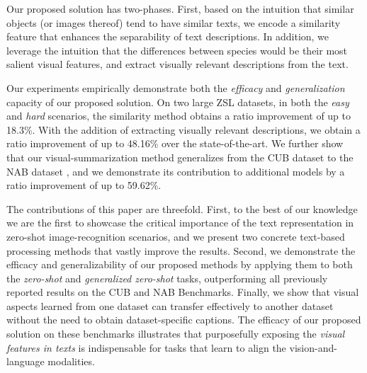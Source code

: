 \documentclass[11pt,a4paper]{article}
\newcommand\gal[1]{\textcolor{bright}{\textbf{GAL:} #1 }}
\newcommand\reut[1]{\textcolor{green}{\textbf{REUT:} #1 }}
\begin{document}
Our proposed solution has two-phases. First,
based on the intuition that similar objects (or images thereof) tend to have similar texts, %
we encode a similarity feature that enhances the separability of text descriptions. %
In addition, we leverage the intuition that the differences between species would be their most salient visual features, and extract visually relevant descriptions from the text.



Our experiments empirically demonstrate both the {\em efficacy} and {\em generalization} capacity of our proposed solution. 
On two large ZSL datasets, %
in both the {\em easy} and {\em hard} scenarios, the similarity method obtains a ratio improvement of up to 18.3\%. With the addition of extracting visually relevant descriptions, we obtain a ratio improvement of up to 48.16\% over the state-of-the-art.
We further show that our visual-summarization method generalizes from the CUB dataset \citep{wah2011caltech} to the NAB dataset \citep{van2015building}, and we demonstrate its contribution to additional models by a ratio improvement of up to 59.62\%.



The contributions of this paper are threefold.
First, to the best of our knowledge we are the first to showcase the critical importance of the text representation in zero-shot image-recognition scenarios, and we present two concrete text-based processing methods that vastly improve the results.
Second, we demonstrate the efficacy and generalizability of our proposed methods by applying them to both the {\em zero-shot} and {\em generalized zero-shot} tasks, outperforming all previously reported results on the CUB and NAB Benchmarks. %
Finally, we show that visual aspects learned from one dataset can transfer effectively to another dataset without the need to obtain dataset-specific captions. 
The efficacy of our proposed solution on these benchmarks illustrates that purposefully exposing the {\em visual features in texts} is indispensable for tasks that learn to align the vision-and-language modalities. %
\end{document}
